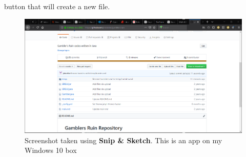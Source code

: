 \documentclass[10pt,fleqn]{article}
\begin{document}
\eject
button that will create a new file.
\vfill
\begin{figure}[h]
\centering
\includegraphics{../images/github_13.png}
\caption{{Screenshot} taken using {\bf Snip \& Sketch}. This is an app on
         my Windows 10 box}
\end{figure}
\eject
\end{document}
